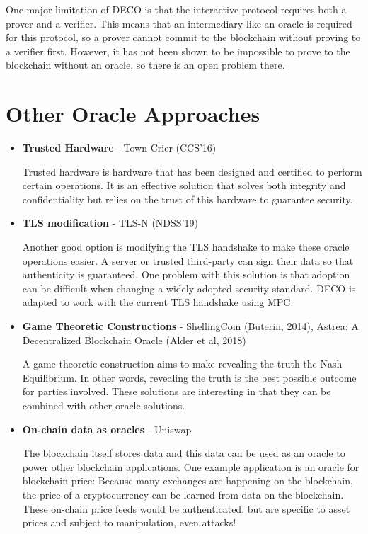 \documentclass[twoside]{article}
\begin{document}
	One major limitation of DECO is that the interactive protocol requires both a prover and a verifier. This means that an intermediary like an oracle is required for this protocol, so a prover cannot commit to the blockchain without proving to a verifier first. However, it has not been shown to be impossible to prove to the blockchain without an oracle, so there is an open problem there.
	
	
	\section{Other Oracle Approaches}
	\begin{itemize}
		\item \textbf{Trusted Hardware} - Town Crier (CCS'16)
		
		Trusted hardware is hardware that has been designed and certified to perform certain operations. It is an effective solution that solves both integrity and confidentiality but relies on the trust of this hardware to guarantee security.
		
		\item \textbf{TLS modification} - TLS-N (NDSS'19)
		
		Another good option is modifying the TLS handshake to make these oracle operations easier. A server or trusted third-party can sign their data so that authenticity is guaranteed. One problem with this solution is that adoption can be difficult when changing a widely adopted security standard. DECO is adapted to work with the current TLS handshake using MPC.
		
		\item \textbf{Game Theoretic Constructions} - ShellingCoin (Buterin, 2014), Astrea: A Decentralized Blockchain Oracle (Alder et al, 2018)
		
		A game theoretic construction aims to make revealing the truth the Nash Equilibrium. In other words, revealing the truth is the best possible outcome for parties involved. These solutions are interesting in that they can be combined with other oracle solutions.
		
		
		\item \textbf{On-chain data as oracles} - Uniswap
		
		The blockchain itself stores data and this data can be used as an oracle to power other blockchain applications. One example application is an oracle for blockchain price: Because many exchanges are happening on the blockchain, the price of a cryptocurrency can be learned from data on the blockchain. These on-chain price feeds would be authenticated, but are specific to asset prices and subject to manipulation, even attacks!
	\end{itemize}
	
	\nocite{deco}
	
	
\end{document}
